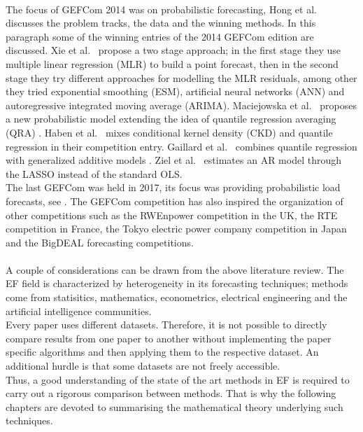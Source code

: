 \\
The focus of GEFCom 2014 was on probabilistic forecasting, Hong et al.\ \cite{hong2016probabilistic} discusses the problem tracks, the data and the winning methods.
In this paragraph some of the winning entries of the 2014 GEFCom edition are discussed.
Xie et al.\ \cite{xie2016gefcom2014} propose a two stage approach; in the first stage they use multiple linear regression (MLR) to build a point forecast, then in the second stage they try different approaches for modelling the MLR residuals, among other they tried exponential smoothing (ESM), artificial neural networks (ANN) and autoregressive integrated moving average (ARIMA). 
Maciejowska et al.\ \cite{maciejowska2016hybrid} proposes a new probabilistic model extending the idea of quantile regression averaging (QRA) \cite{nowotarski2015computing}.
Haben et al.\ \cite{haben2016hybrid} mixes conditional kernel density (CKD) and quantile regression in their competition entry.
Gaillard et al.\ \cite{gaillard2016additive,gaillardasemi} combines quantile regression with generalized additive models \cite{hastie2017generalized}.
Ziel et al.\ \cite{ziel2016lasso} estimates an AR model through the LASSO \cite{tibshirani1996regression} instead of the standard OLS.
\\
The last GEFCom was held in 2017, its focus was providing probabilistic load forecasts, see \cite{hong2019global}. The GEFCom competition has also inspired the organization of other competitions such as the RWEnpower competition in the UK, the RTE competition in France, the Tokyo electric power company competition in Japan and the BigDEAL forecasting competitions.
\\
\\
A couple of considerations can be drawn from the above literature review.
The EF field is characterized by heterogeneity in its forecasting techniques; methods come from statisitics, mathematics, econometrics, electrical engineering and the artificial intelligence communities.
\\
Every paper uses different datasets.
Therefore, it is not possible to directly compare results from one paper to another without implementing the paper specific algorithms and then applying them to the respective dataset. An additional hurdle is that some datasets are not freely accessible.
\\
Thus, a good understanding of the state of the art methods in EF is required to carry out a rigorous comparison between methods.
That is why the following chapters are devoted to summarising the mathematical theory underlying such techniques.


